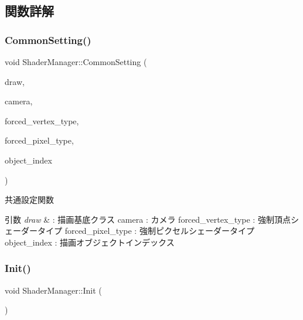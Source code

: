 \subsection{関数詳解}
\mbox{\label{class_shader_manager_a6cfff8f4aee59d9bc5162a5a6f4d07d4}} 
\subsubsection{\texorpdfstring{Common\+Setting()}{CommonSetting()}}
{\footnotesize\ttfamily void Shader\+Manager\+::\+Common\+Setting (\begin{DoxyParamCaption}\item[{\mbox{\hyperlink{class_draw_base}{Draw\+Base}} $\ast$}]{draw,  }\item[{\mbox{\hyperlink{class_camera}{Camera}} $\ast$}]{camera,  }\item[{\mbox{\hyperlink{class_shader_manager_a9b51e49d70eb3cc58f6d1f3994e8cfbd}{Vertex\+Shader\+Type}}}]{forced\+\_\+vertex\+\_\+type,  }\item[{\mbox{\hyperlink{class_shader_manager_a7d15d773b3c6a99dd7086c45c8b0be5f}{Pixel\+Shader\+Type}}}]{forced\+\_\+pixel\+\_\+type,  }\item[{unsigned}]{object\+\_\+index }\end{DoxyParamCaption})}



共通設定関数 


\begin{DoxyParams}{引数}
{\em draw} & \+: 描画基底クラス camera \+: カメラ forced\+\_\+vertex\+\_\+type \+: 強制頂点シェーダータイプ forced\+\_\+pixel\+\_\+type \+: 強制ピクセルシェーダータイプ object\+\_\+index \+: 描画オブジェクトインデックス \\
\hline
\end{DoxyParams}
\mbox{\label{class_shader_manager_a8e8fd62a28cc18addcd5ec6507a5dcb0}} 
\subsubsection{\texorpdfstring{Init()}{Init()}}
{\footnotesize\ttfamily void Shader\+Manager\+::\+Init (\begin{DoxyParamCaption}{ }\end{DoxyParamCaption})}



